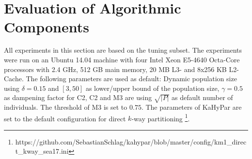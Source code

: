 \documentclass[a4paper,12pt,titlepage, BCOR7mm,headsepline]{scrbook}
\numberwithin{equation}{section}
\begin{document}
\section{Evaluation of Algorithmic Components} 
All experiments in this section are based on the tuning subset. The experiments were run on an Ubuntu 14.04 machine with four Intel Xeon E5-4640 Octa-Core processors  with 2.4 GHz, 512 GB main memory, 20 MB L3- and 8x256 KB L2-Cache. The following parameters are used as default: Dynamic population size using $\delta = 0.15$ and $[3,50]$ as lower/upper bound of the population size, $\gamma = 0.5$ as dampening factor for C2, C2 and M3 are using $\sqrt{|P|}$ as default number of individuals. The threshold of M3 is set to $0.75$. The parameters of KaHyPar are set to the default configuration for direct $k$-way partitioning \footnote{https://github.com/SebastianSchlag/kahypar/blob/master/config/km1\_direct\_kway\_sea17.ini}.
\end{document}
